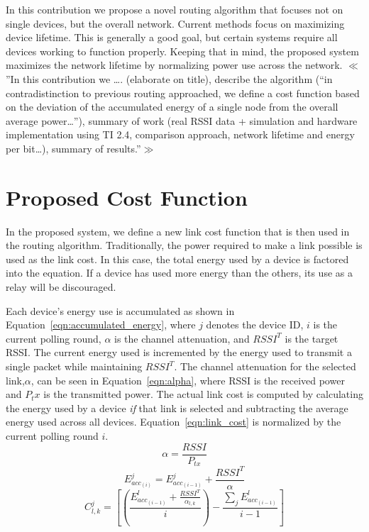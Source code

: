\documentclass{article}
\begin{document}
In this contribution we propose a novel routing algorithm that focuses not on single devices, but the overall network. Current methods focus on maximizing device lifetime. This is generally a good goal, but certain systems require all devices working to function properly. Keeping that in mind, the proposed system maximizes the network lifetime by normalizing power use across the network.
$\ll$”In this contribution we …. (elaborate on title), describe the algorithm (“in contradistinction to previous routing approached, we define a cost function based on the deviation of the accumulated energy of a single node from the overall average power…”), summary of work (real RSSI data + simulation and hardware implementation using TI 2.4, comparison approach, network lifetime and energy per bit…), summary of results.”$\gg$ 

\section{Proposed Cost Function}
In the proposed system, we define a new link cost function that is then used in the routing algorithm. Traditionally, the power required to make a link possible is used as the link cost. In this case, the total energy used by a device is factored into the equation. If a device has used more energy than the others, its use as a relay will be discouraged.

Each device's energy use is accumulated as shown in Equation~\ref{eqn:accumulated_energy}, where $j$ denotes the device ID, $i$ is the current polling round, $\alpha$ is the channel attenuation, and $RSSI^T$ is the target RSSI. The current energy used is incremented by the energy used to transmit a single packet while maintaining $RSSI^T$. The channel attenuation for the selected link,$\alpha$, can be seen in Equation~\ref{eqn:alpha}, where RSSI is the received power and $P_tx$ is the transmitted power. The actual link cost is computed by calculating the energy used by a device \emph{if} that link is selected and subtracting the average energy used across all devices. Equation~\ref{eqn:link_cost} is normalized by the current polling round $i$.
\begin{equation}
\label{eqn:alpha}
\alpha = \frac{RSSI}{P_{tx}}
\end{equation}
\begin{equation}
\label{eqn:accumulated_energy}
E^j_{acc_{(i)}} = E^j_{acc_{(i-1)}} + \frac{RSSI^T}{\alpha}
\end{equation}
\begin{equation}
\label{eqn:link_cost}
C^j_{l,k} = \left[ \left(\frac{ E^l_{acc_{(i-1)}} + \frac{RSSI^T}{\alpha_{l,k}}}{i}\right) - \frac{\sum_jE^l_{acc_{(i-1)}}}{i-1} \right]
\end{equation}
\end{document}
